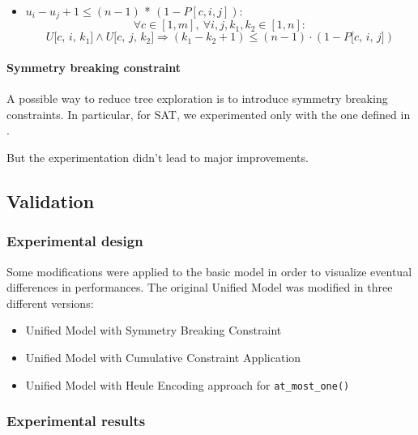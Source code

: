 \begin{itemize}
\begin{itemize}
\begin{itemize}
            \item $u_i - u_j + 1 \leq (n - 1)$ * $(1 - P[c, i, j] )$:
            \begin{equation}
                \label{eq:subtour_constr5}
                \forall c \in [1, m], \ \forall i, j, k_1, k_2 \in [1, n]: 
            \end{equation}
            \[
                U\texttt{[$c$, $i$, $k_1$]} \land U\texttt{[$c$, $j$, $k_2$]} \Rightarrow
                (k_1 - k_2 + 1) \leq (n-1) \cdot (1 - P\texttt{[$c$, $i$, $j$]})
            \]
        \end{itemize}
    \end{itemize}
\end{itemize}

\paragraph*{Symmetry breaking constraint}

A possible way to reduce tree exploration is to introduce symmetry breaking constraints. In particular, for SAT, we experimented only with the one defined in .

But the experimentation didn't lead to major improvements.

\subsection{Validation}

\subsubsection*{Experimental design}

Some modifications were applied to the basic model in order to visualize eventual differences in performances.
The original Unified Model was modified in three different versions:
\begin{itemize}
    \item Unified Model with Symmetry Breaking Constraint
    \item Unified Model with Cumulative Constraint Application
    \item Unified Model with Heule Encoding approach for \texttt{at\_most\_one()}
\end{itemize}
\subsubsection*{Experimental results}

